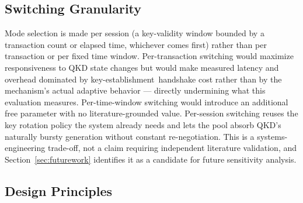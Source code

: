 \documentclass[journal]{IEEEtran}
\newcommand{\keyest}{key-establishment}
\begin{document}
\subsection{Switching Granularity}
Mode selection is made per session (a key-validity window bounded by a transaction count or elapsed time, whichever comes first) rather than per transaction or per fixed time window. Per-transaction switching would maximize responsiveness to QKD state changes but would make measured latency and overhead dominated by \keyest\ handshake cost rather than by the mechanism's actual adaptive behavior --- directly undermining what this evaluation measures. Per-time-window switching would introduce an additional free parameter with no literature-grounded value. Per-session switching reuses the key rotation policy the system already needs and lets the pool absorb QKD's naturally bursty generation without constant re-negotiation. This is a systems-engineering trade-off, not a claim requiring independent literature validation, and Section~\ref{sec:futurework} identifies it as a candidate for future sensitivity analysis.

\subsection{Design Principles}
\label{sec:designprinciples}
\end{document}

